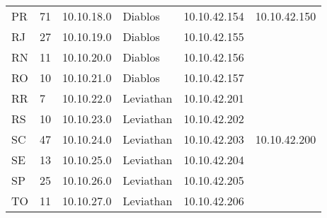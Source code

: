 \begin{table}[h]
{{\begin{tabular}{llllll}
        PR &  71 &  10.10.18.0 &  Diablos & 10.10.42.154  & 10.10.42.150 \\
        RJ &  27 &  10.10.19.0 &  Diablos & 10.10.42.155  & \\  
        RN &  11 &  10.10.20.0 &  Diablos & 10.10.42.156  & \\  
        RO &  10 &  10.10.21.0 &  Diablos & 10.10.42.157  & \\ \hline
        RR  & 7  &  10.10.22.0 &  Leviathan &   10.10.42.201 & \\
        RS &  10 &  10.10.23.0 &  Leviathan &   10.10.42.202  & \\  
        SC &  47 &  10.10.24.0 &  Leviathan &   10.10.42.203 & 10.10.42.200 \\   
        SE &  13 &  10.10.25.0 &  Leviathan &   10.10.42.204 & \\   
        SP &  25 &  10.10.26.0 &  Leviathan &   10.10.42.205  & \\  
        TO &  11 &  10.10.27.0 &  Leviathan &   10.10.42.206 & \\   
    \end{tabular}
    }}
\end{table}
